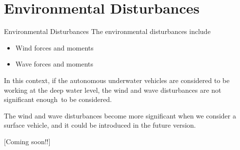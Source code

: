 \section{Environmental Disturbances}

\begin{frame}{Environmental Disturbances}
	The environmental disturbances include
	\begin{itemize}
		\item Wind forces and moments
		\item Wave forces and moments
	\end{itemize}
	
	In this context, if the autonomous underwater vehicles are considered to be working at the deep water level, the wind and wave disturbances are not significant enough to be considered.
	
	\vspace{1cm}
	The wind and wave disturbances become more significant when we consider a surface vehicle, and it could be introduced in the future version.
	
	
	[Coming soon!!]
\end{frame}


